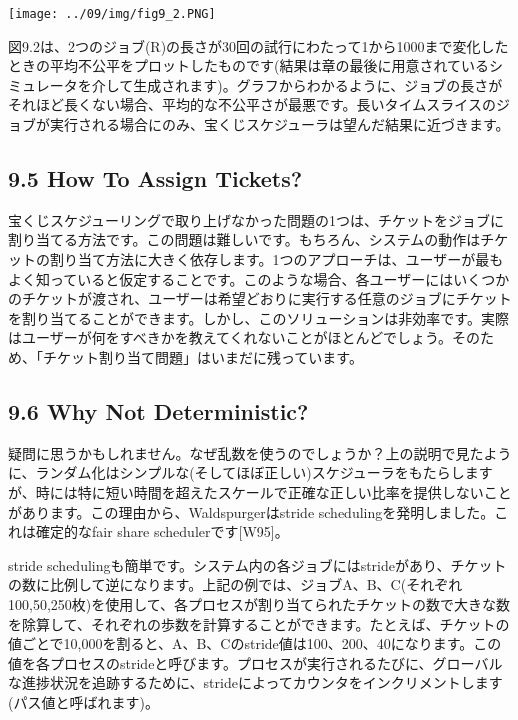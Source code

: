 \texttt{[image: ../09/img/fig9\_2.PNG]}

図9.2は、2つのジョブ(R)の長さが30回の試行にわたって1から1000まで変化したときの平均不公平をプロットしたものです(結果は章の最後に用意されているシミュレータを介して生成されます)。グラフからわかるように、ジョブの長さがそれほど長くない場合、平均的な不公平さが最悪です。長いタイムスライスのジョブが実行される場合にのみ、宝くじスケジューラは望んだ結果に近づきます。

\hypertarget{how-to-assign-tickets}{%
\subsection*{9.5 How To Assign Tickets?}\label{how-to-assign-tickets}}

宝くじスケジューリングで取り上げなかった問題の1つは、チケットをジョブに割り当てる方法です。この問題は難しいです。もちろん、システムの動作はチケットの割り当て方法に大きく依存します。1つのアプローチは、ユーザーが最もよく知っていると仮定することです。このような場合、各ユーザーにはいくつかのチケットが渡され、ユーザーは希望どおりに実行する任意のジョブにチケットを割り当てることができます。しかし、このソリューションは非効率です。実際はユーザーが何をすべきかを教えてくれないことがほとんどでしょう。そのため、「チケット割り当て問題」はいまだに残っています。

\hypertarget{why-not-deterministic}{%
\subsection*{9.6 Why Not Deterministic?}\label{why-not-deterministic}}

疑問に思うかもしれません。なぜ乱数を使うのでしょうか？上の説明で見たように、ランダム化はシンプルな(そしてほぼ正しい)スケジューラをもたらしますが、時には特に短い時間を超えたスケールで正確な正しい比率を提供しないことがあります。この理由から、Waldspurgerはstride
schedulingを発明しました。これは確定的なfair share
schedulerです{[}W95{]}。

stride
schedulingも簡単です。システム内の各ジョブにはstrideがあり、チケットの数に比例して逆になります。上記の例では、ジョブA、B、C(それぞれ100,50,250枚)を使用して、各プロセスが割り当てられたチケットの数で大きな数を除算して、それぞれの歩数を計算することができます。たとえば、チケットの値ごとで10,000を割ると、A、B、Cのstride値は100、200、40になります。この値を各プロセスのstrideと呼びます。プロセスが実行されるたびに、グローバルな進捗状況を追跡するために、strideによってカウンタをインクリメントします(パス値と呼ばれます)。

